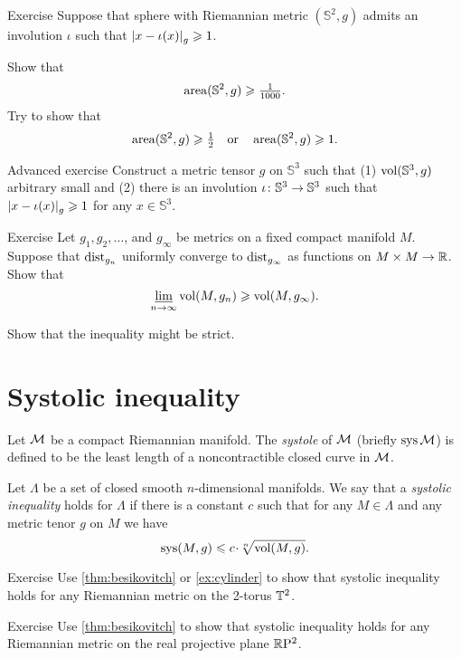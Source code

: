 \begin{thm}{Exercise}\label{ex:involution-of-sphere}
Suppose that sphere with Riemannian metric $(\mathbb{S}^2,g)$ admits an involution $\iota$ such that $\dist{x}{\iota(x)}{g}\ge 1$.

Show that 
\[\operatorname{\rm area}\nolimits(\mathbb{S}^2,g)\geqslant \tfrac1{1000}.\]
Try to show that 
\[\operatorname{\rm area}\nolimits(\mathbb{S}^2,g)\geqslant \tfrac12\quad\text{or}\quad \operatorname{\rm area}\nolimits(\mathbb{S}^2,g)\geqslant 1.\]
\end{thm}

\begin{thm}{Advanced exercise}\label{ex:involution-of-3sphere}
Construct a metric tensor $g$ on $\mathbb{S}^3$ such that (1) $\operatorname{\rm vol}\nolimits(\mathbb{S}^3,g)$ arbitrary small and (2) there is an involution $\iota\:\mathbb{S}^3\z\to \mathbb{S}^3$ such that $\dist{x}{\iota(x)}{g}\ge 1$ for any $x\in \mathbb{S}^3$.
\end{thm}

\begin{thm}{Exercise}\label{ex:GH-vol}
Let $g_1,g_2,\dots$, and $g_\infty$ be metrics on a fixed compact manifold $M$.
Suppose that $\mathrm{dist}_{g_n}$ uniformly converge to $\mathrm{dist}_{g_\infty}$ as functions on $M\times M\to\mathbb{R}$.
Show that 
\[\varliminf_{n\to\infty}\operatorname{\rm vol}\nolimits(M,g_n)\geqslant \operatorname{\rm vol}\nolimits(M,g_\infty).\]

Show that the inequality might be strict.
\end{thm}

\section{Systolic inequality}

Let $\mathcal{M}$ be a compact Riemannian manifold.
The \emph{systole} of $\mathcal{M}$ (briefly $\mathop{\rm sys}\nolimits\mathcal{M}$) is defined to be the least length of a noncontractible closed curve in $\mathcal{M}$.

Let $\Lambda$ be a set of closed smooth $n$-dimensional manifolds.
We say that a \emph{systolic inequality} holds for $\Lambda$ if there is a constant $c$ such that for any $M\in \Lambda$ and any metric tenor $g$ on $M$ we have
\[\sys(M,g)\le c\cdot \sqrt[n]{\vol(M,g)}.\]

\begin{thm}{Exercise}\label{ex:sysT2}
Use \ref{thm:besikovitch} or \ref{ex:cylinder} to show that systolic inequality holds for any Riemannian metric on the 2-torus $\mathbb{T}^2$.
\end{thm}

\begin{thm}{Exercise}\label{ex:sysRP2}
Use \ref{thm:besikovitch} to show that systolic inequality holds for any Riemannian metric on  the real projective plane $\mathbb{R}\mathrm{P}^2$.
\end{thm}

